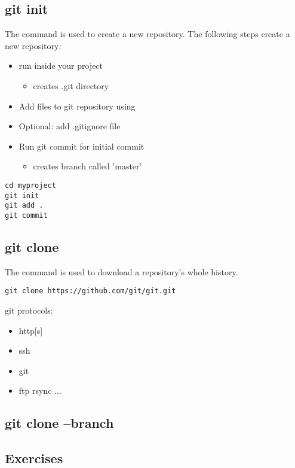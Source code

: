 \subsection{git init}
\begin{frame}[fragile]
  \subslidetitle
  The command  is used to create a new repository.
  The following steps create a new repository:
  \begin{itemize}
  \item run  inside your project
    \begin{itemize}
    \item creates .git directory
    \end{itemize}
  \item Add files to git repository using 
  \item Optional: add .gitignore file
  \item Run {git commit} for initial commit
    \begin{itemize}
    \item creates branch called 'master'
    \end{itemize}
  \end{itemize}

  \begin{lstlisting}
cd myproject
git init
git add .
git commit
  \end{lstlisting}
\end{frame}

\subsection{git clone}
\begin{frame}[fragile]
  \subslidetitle
  The command  is used to download a repository's whole history.
  \begin{lstlisting}
git clone https://github.com/git/git.git
  \end{lstlisting}

git protocols:
\begin{itemize}
\item http[s]
\item ssh
\item git
\item ftp rsync ...
\end{itemize}
\end{frame}

\subsection{git clone --branch}
\begin{frame}[fragile]
  \subslidetitle
\end{frame}

\subsection{Exercises}
\begin{frame}[fragile]
  \subslidetitle
\end{frame}

